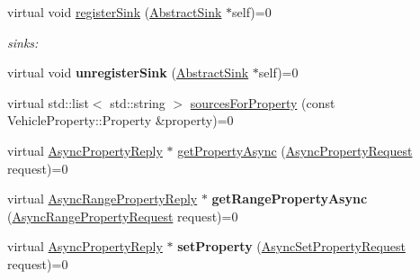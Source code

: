 \begin{DoxyCompactItemize}
\item 
\hypertarget{classAbstractRoutingEngine_a179052d9ab3f70ddb4c91421f94c45a9}{virtual void \hyperlink{classAbstractRoutingEngine_a179052d9ab3f70ddb4c91421f94c45a9}{register\-Sink} (\hyperlink{classAbstractSink}{Abstract\-Sink} $\ast$self)=0}\label{classAbstractRoutingEngine_a179052d9ab3f70ddb4c91421f94c45a9}

\begin{DoxyCompactList}\small\item\em sinks\-: \end{DoxyCompactList}\item 
\hypertarget{classAbstractRoutingEngine_a0f0a96c938c395565d01e0f78cc3bea8}{virtual void {\bfseries unregister\-Sink} (\hyperlink{classAbstractSink}{Abstract\-Sink} $\ast$self)=0}\label{classAbstractRoutingEngine_a0f0a96c938c395565d01e0f78cc3bea8}

\item 
virtual std\-::list$<$ std\-::string $>$ \hyperlink{classAbstractRoutingEngine_ab45a376fc305fbf072c6cb7e98416895}{sources\-For\-Property} (const Vehicle\-Property\-::\-Property \&property)=0
\item 
virtual \hyperlink{classAsyncPropertyReply}{Async\-Property\-Reply} $\ast$ \hyperlink{classAbstractRoutingEngine_ad1cbda415f674be4a3ce49be05aa8ee8}{get\-Property\-Async} (\hyperlink{classAsyncPropertyRequest}{Async\-Property\-Request} request)=0
\item 
\hypertarget{classAbstractRoutingEngine_a335eaf3aea69c5b55b28819119156dd6}{virtual \hyperlink{classAsyncRangePropertyReply}{Async\-Range\-Property\-Reply} $\ast$ {\bfseries get\-Range\-Property\-Async} (\hyperlink{classAsyncRangePropertyRequest}{Async\-Range\-Property\-Request} request)=0}\label{classAbstractRoutingEngine_a335eaf3aea69c5b55b28819119156dd6}

\item 
\hypertarget{classAbstractRoutingEngine_a740b2c9bd8f842499cf250f660553651}{virtual \hyperlink{classAsyncPropertyReply}{Async\-Property\-Reply} $\ast$ {\bfseries set\-Property} (\hyperlink{classAsyncSetPropertyRequest}{Async\-Set\-Property\-Request} request)=0}\label{classAbstractRoutingEngine_a740b2c9bd8f842499cf250f660553651}


\end{DoxyCompactItemize}
